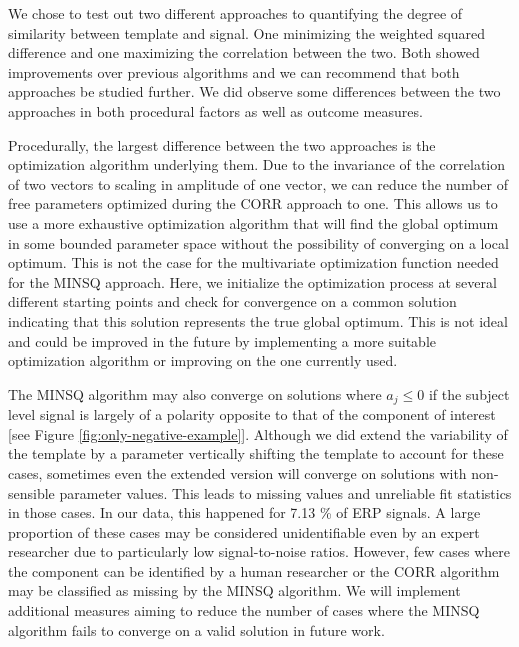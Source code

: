 \documentclass[
  man]{apa7}
\begin{document}
We chose to test out two different approaches to quantifying the degree of similarity between template and signal. One minimizing the weighted squared difference and one maximizing the correlation between the two. Both showed improvements over previous algorithms and we can recommend that both approaches be studied further. We did observe some differences between the two approaches in both procedural factors as well as outcome measures.

Procedurally, the largest difference between the two approaches is the optimization algorithm underlying them. Due to the invariance of the correlation of two vectors to scaling in amplitude of one vector, we can reduce the number of free parameters optimized during the CORR approach to one. This allows us to use a more exhaustive optimization algorithm that will find the global optimum in some bounded parameter space without the possibility of converging on a local optimum. This is not the case for the multivariate optimization function needed for the MINSQ approach. Here, we initialize the optimization process at several different starting points and check for convergence on a common solution indicating that this solution represents the true global optimum. This is not ideal and could be improved in the future by implementing a more suitable optimization algorithm or improving on the one currently used.

The MINSQ algorithm may also converge on solutions where \(a_j \le 0\) if the subject level signal is largely of a polarity opposite to that of the component of interest {[}see Figure \ref{fig:only-negative-example}{]}. Although we did extend the variability of the template by a parameter vertically shifting the template to account for these cases, sometimes even the extended version will converge on solutions with non-sensible parameter values. This leads to missing values and unreliable fit statistics in those cases. In our data, this happened for 7.13 \% of ERP signals. A large proportion of these cases may be considered unidentifiable even by an expert researcher due to particularly low signal-to-noise ratios. However, few cases where the component can be identified by a human researcher or the CORR algorithm may be classified as missing by the MINSQ algorithm. We will implement additional measures aiming to reduce the number of cases where the MINSQ algorithm fails to converge on a valid solution in future work.
\end{document}
